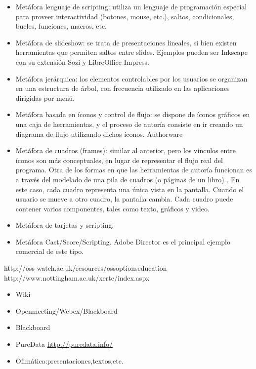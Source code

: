 \documentclass[12pt]{article}
\begin{document}
\begin{itemize}
\item Metáfora lenguaje de scripting: utiliza un lenguaje de 
programación especial para proveer interactividad (botones, mouse, etc.), 
saltos, condicionales, bucles, funciones, macros, etc.  
\item Metáfora de slideshow: se trata de presentaciones lineales, si bien existen 
herramientas que permiten saltos entre slides. Ejemplos pueden ser Inkscape con su 
extensión Sozi y LibreOffice Impress. 
\item Metáfora jerárquica: los elementos controlables por los usuarios se 
organizan en una estructura de árbol, con frecuencia utilizado en las aplicaciones
dirigidas por menú. 
\item Metáfora basada en íconos y control de flujo: se dispone de íconos gráficos 
en una caja de herramientas, y el proceso de autoría consiste en ir creando un 
diagrama de flujo utilizando dichos íconos. Authorware
\item Metáfora de cuadros (frames): similar al anterior, pero los vínculos entre 
íconos son más conceptuales, en lugar de representar el flujo real del programa.
Otra de los formas en que las herramientas de autoría funcionan es a través del
modelado de una pila de cuadros (o páginas de un libro) . En este caso, cada cuadro
representa una única vista en la pantalla. Cuando el usuario se mueve a otro cuadro, 
la pantalla cambia. Cada cuadro puede contener varios componentes, tales como texto, 
gráficos y video.
\item Metáfora de tarjetas y scripting: 
\item Metáfora Cast/Score/Scripting. Adobe Director es el principal ejemplo
comercial de este tipo. 
\end{itemize}

http://oss-watch.ac.uk/resources/ossoptionseducation
http://www.nottingham.ac.uk/xerte/index.aspx

\begin{itemize}
\item{Wiki}
\item{Openmeeting/Webex/Blackboard}
\item{Blackboard}
\item{PureData} \url{http://puredata.info/}
\item{Ofimática:presentaciones,textos,etc.}
\end{itemize}
\end{document}
